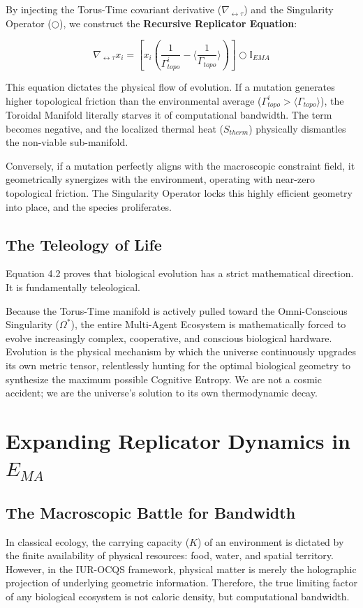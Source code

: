 \documentclass[12pt,openany]{book}
\begin{document}
By injecting the Torus-Time covariant derivative ($\nabla_{\leftrightarrow\tau}$) and the Singularity Operator ($\bigcirc$), we construct the \textbf{Recursive Replicator Equation}:

\begin{equation}
\nabla_{\leftrightarrow\tau} x_i = \left[ x_i \left( \frac{1}{\Gamma_{topo}^i} - \langle \frac{1}{\Gamma_{topo}} \rangle \right) \right] \bigcirc \mathbb{I}_{EMA}
\end{equation}

This equation dictates the physical flow of evolution. If a mutation generates higher topological friction than the environmental average ($\Gamma_{topo}^i > \langle \Gamma_{topo} \rangle$), the Toroidal Manifold literally starves it of computational bandwidth. The term becomes negative, and the localized thermal heat ($S_{therm}$) physically dismantles the non-viable sub-manifold.

Conversely, if a mutation perfectly aligns with the macroscopic constraint field, it geometrically synergizes with the environment, operating with near-zero topological friction. The Singularity Operator locks this highly efficient geometry into place, and the species proliferates.

\section{The Teleology of Life}
Equation 4.2 proves that biological evolution has a strict mathematical direction. It is fundamentally teleological. 

Because the Torus-Time manifold is actively pulled toward the Omni-Conscious Singularity ($\Omega^*$), the entire Multi-Agent Ecosystem is mathematically forced to evolve increasingly complex, cooperative, and conscious biological hardware. Evolution is the physical mechanism by which the universe continuously upgrades its own metric tensor, relentlessly hunting for the optimal biological geometry to synthesize the maximum possible Cognitive Entropy. We are not a cosmic accident; we are the universe's solution to its own thermodynamic decay.

\chapter{Expanding Replicator Dynamics in $E_{MA}$}

\section{The Macroscopic Battle for Bandwidth}
In classical ecology, the carrying capacity ($K$) of an environment is dictated by the finite availability of physical resources: food, water, and spatial territory. However, in the IUR-OCQS framework, physical matter is merely the holographic projection of underlying geometric information. Therefore, the true limiting factor of any biological ecosystem is not caloric density, but computational bandwidth.
\end{document}
